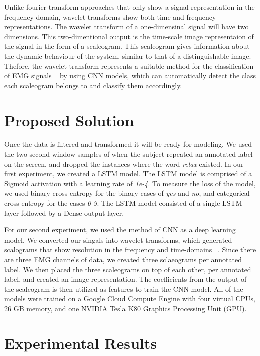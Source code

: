 \documentclass[conference]{IEEEtran}
\begin{document}
Unlike fourier transform approaches that only show a signal representation in the frequency domain, wavelet transforms show both time and frequency representations. The wavelet transform of a one-dimensinal signal will have two dimensions. This two-dimentional output is the time-scale image representaion of the signal in the form of a scaleogram. This scaleogram gives information about the dynamic behaviour of the system, similar to that of a distinguishable image. Thefore, the wavelet transform represents a suitable method for the classification of EMG signals ~\cite{pauk_419._2008} by using CNN models, which can automatically detect the class each scaleogram belongs to and classify them accordingly.

\section{Proposed Solution} \label{Proposed Solution}
Once the data is filtered and transformed it will be ready for modeling. We used the two second window samples of when the subject repeated an annotated label on the screen, and dropped the instances where the word \textit{relax} existed. In our first experiment, we created a LSTM model. The LSTM model is comprised of a Sigmoid activation with a learning rate of \textit{1e-4}. To measure the loss of the model, we used binary cross-entropy for the binary cases of \textit{yes} and \textit{no}, and categorical cross-entropy for the cases \textit{0-9}. The LSTM model consisted of a single LSTM layer followed by a Dense output layer. 

For our second experiment, we used the method of CNN as a deep learning model. We converted our singals into wavelet transforms, which generated scalograms that show resolution in the frequency and time-domains ~\cite{admin_guide_2018}. Since there are three EMG channels of data, we created three sclaeograms per annotated label.  We then placed the three scaleograms on top of each other, per annotated label, and created an image representation. The coefficients from the output of the scaleogram is then utilized as features to train the CNN model. All of the models were trained on a Google Cloud Compute Engine with four virtual CPUs, 26 GB memory, and one NVIDIA Tesla K80 Graphics Processing Unit (GPU).

\section{Experimental Results}
\end{document}
